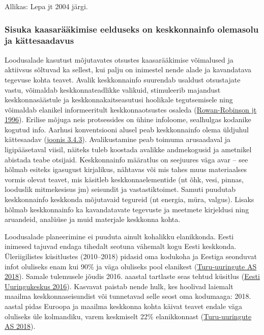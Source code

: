 \documentclass[estonian,]{article}
\begin{document}
\begin{imgsource}
{Allikas:} Lepa jt 2004 järgi.
\end{imgsource}

\hypertarget{sisuka-kaasaruxe4uxe4kimise-eelduseks-on-keskkonnainfo-olemasolu-ja-kuxe4ttesaadavus}{%
\subsubsection*{Sisuka kaasarääkimise eelduseks on keskkonnainfo olemasolu ja kättesaadavus}\label{sisuka-kaasaruxe4uxe4kimise-eelduseks-on-keskkonnainfo-olemasolu-ja-kuxe4ttesaadavus}}

Loodusalade kasutust mõjutavates otsustes kaasarääkimise võimalused ja aktiivsus sõltuvad ka sellest, kui palju on inimestel nende alade ja kavandatava tegevuse kohta teavet. Avalik keskkonnainfo suurendab usaldust otsustajate vastu, võimaldab keskkonnateadlikke valikuid, stimuleerib majandust keskkonnasäästule ja keskkonnakaitseasutusi hoolikale tegutsemisele ning võimaldab elanikel informeeritult keskkonnaotsustes osaleda (\protect\hyperlink{Rowan1996}{Rowan-Robinson jt 1996}). Erilise mõjuga neis protsessides on ühine infoloome, sealhulgas kodanike kogutud info.
Aarhusi konventsiooni alusel peab keskkonnainfo olema üldjuhul kättesaadav (\protect\hyperlink{figure343}{joonis 3.4.3}). Avalikustamine peab toimuma arusaadaval ja ligipääsetaval viisil, näiteks tuleb koostada avalikke andmekogusid ja ametnikel abistada teabe otsijaid. Keskkonnainfo määratlus on seejuures väga avar -- see hõlmab esiteks igasugust kirjalikus, nähtavas või mis tahes muus materiaalses vormis olevat teavet, mis käsitleb keskkonnaelementide (nt õhk, vesi, pinnas, looduslik mitmekesisus jm) seisundit ja vastastiktoimet. Samuti puudutab keskkonnainfo keskkonda mõjutavaid tegureid (nt energia, müra, valgus). Lisaks hõlmab keskkonnainfo ka kavandatavate tegevuste ja meetmete kirjeldusi ning aruandeid, analüüse ja muid materjale keskkonna kohta.

Loodusalade planeerimine ei puuduta ainult kohalikku elanikkonda. Eesti inimesed tajuvad endaga tihedalt seotuna vähemalt kogu Eesti keskkonda. Üleriigilistes küsitlustes (2010--2018) pidasid oma kodukoha ja Eestiga seonduvat infot oluliseks enam kui 90\% ja väga oluliseks pool elanikest (\protect\hyperlink{Turu-uuringute2018}{Turu-uuringute AS 2018}). Samale tulemusele jõudis 2016. aaastal tartlaste seas tehtud küsitlus (\protect\hyperlink{Eesti2016}{Eesti Uuringukeskus 2016}). Kasvavat paistab nende hulk, kes hoolivad laiemalt maailma keskkonnaseisundist või tunnetavad selle seost oma kodumaaga: 2018. aastal pidas Euroopa ja maailma keskkonna kohta käivat teavet endale väga oluliseks üle kolmandiku, varem keskmiselt 22\% elanikkonnast (\protect\hyperlink{Turu-uuringute2018}{Turu-uuringute AS 2018}).
\end{document}
